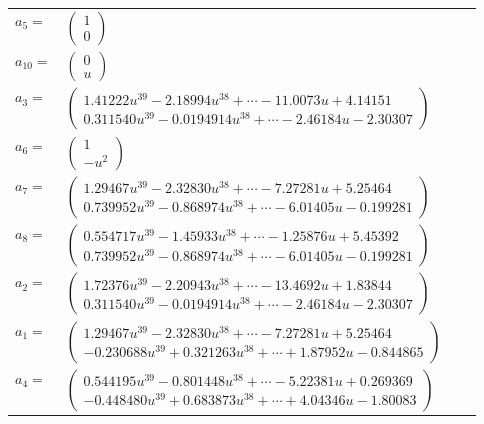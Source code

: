 \documentclass[1p]{elsarticle_modified}
\theoremstyle{definition}
\begin{document}
\begin{tabular}{m{7pt} m{180pt} m{7pt} m{180pt} }
\flushright $a_{5}=$&$\begin{pmatrix}1\\0\end{pmatrix}$ \\
\flushright $a_{10}=$&$\begin{pmatrix}0\\u\end{pmatrix}$ \\
\flushright $a_{3}=$&$\begin{pmatrix}1.41222 u^{39}-2.18994 u^{38}+\cdots-11.0073 u+4.14151\\0.311540 u^{39}-0.0194914 u^{38}+\cdots-2.46184 u-2.30307\end{pmatrix}$ \\
\flushright $a_{6}=$&$\begin{pmatrix}1\\- u^2\end{pmatrix}$ \\
\flushright $a_{7}=$&$\begin{pmatrix}1.29467 u^{39}-2.32830 u^{38}+\cdots-7.27281 u+5.25464\\0.739952 u^{39}-0.868974 u^{38}+\cdots-6.01405 u-0.199281\end{pmatrix}$ \\
\flushright $a_{8}=$&$\begin{pmatrix}0.554717 u^{39}-1.45933 u^{38}+\cdots-1.25876 u+5.45392\\0.739952 u^{39}-0.868974 u^{38}+\cdots-6.01405 u-0.199281\end{pmatrix}$ \\
\flushright $a_{2}=$&$\begin{pmatrix}1.72376 u^{39}-2.20943 u^{38}+\cdots-13.4692 u+1.83844\\0.311540 u^{39}-0.0194914 u^{38}+\cdots-2.46184 u-2.30307\end{pmatrix}$ \\
\flushright $a_{1}=$&$\begin{pmatrix}1.29467 u^{39}-2.32830 u^{38}+\cdots-7.27281 u+5.25464\\-0.230688 u^{39}+0.321263 u^{38}+\cdots+1.87952 u-0.844865\end{pmatrix}$ \\
\flushright $a_{4}=$&$\begin{pmatrix}0.544195 u^{39}-0.801448 u^{38}+\cdots-5.22381 u+0.269369\\-0.448480 u^{39}+0.683873 u^{38}+\cdots+4.04346 u-1.80083\end{pmatrix}$ \\

\end{tabular}
\end{document}
